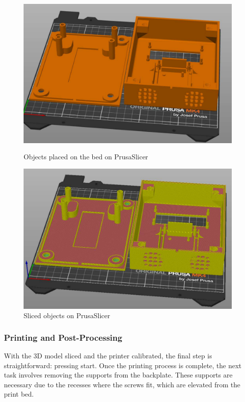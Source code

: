 \begin{figure}[h]
    \centering
    \begin{minipage}[b]{0.47\textwidth}
        \centering
        \includegraphics[width=1\textwidth]{Imagenes/Vectorial/prusaslicer_objects.pdf}
        \caption{Objects placed on the bed on PrusaSlicer}
        \label{fig:prusaslicer_objects}
    \end{minipage}
    \hfill
    \begin{minipage}[b]{0.47\textwidth}
        \centering
        \includegraphics[width=1\textwidth]{Imagenes/Vectorial/prusaslicer_sliced.pdf}
        \caption{Sliced objects on PrusaSlicer}
        \label{fig:prusaslicer_sliced}
    \end{minipage}
\end{figure}

\subsubsection{Printing and Post-Processing}

With the 3D model sliced and the printer calibrated, the final step is straightforward: pressing start. Once the printing process is complete, the next task involves removing the supports from the backplate. These supports are necessary due to the recesses where the screws fit, which are elevated from the print bed.


